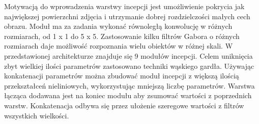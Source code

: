 \documentclass[12pt,a4paper,twoside,titlepage,openright]{book}
\begin{document}
Motywacją do wprowadzenia warstwy incepcji jest umożliwienie pokrycia jak największej powierzchni zdjęcia i utrzymanie dobrej rozdzielczości małych cech obrazu. Moduł ma za zadania wykonać równoległą konwolucję w różnych rozmiarach, od 1 x 1 do 5 x 5. Zastosowanie kilku filtrów Gabora o różnych rozmiarach daje możliwość rozpoznania wielu obiektów w różnej skali. W przedstawionej architekturze znajduje się 9 modułów incepcji. Celem uniknięcia zbyt wielkiej ilości parametrów zastosowano techniki wąskiego gardła. Używając konkatenacji parametrów można zbudować moduł incepcji z większą ilością przekształceń nieliniowych, wykorzystując mniejszą liczbę parametrów. Warstwa łącząca dodawana jest na koniec modułu aby zsumować wartości z poprzednich warstw. Konkatenacja odbywa się przez ułożenie szeregowe wartości z filtrów wszystkich wielkości.
\end{document}
